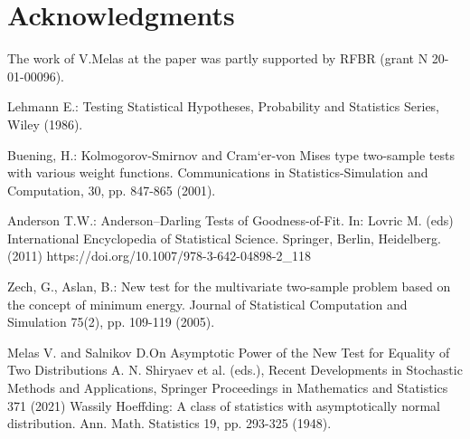 \documentclass[final,11pt,3p]{elsarticle}
\begin{document}
\section*{Acknowledgments}
The work of V.Melas at the paper was partly supported by RFBR (grant N 20-01-00096). 
\begin{thebibliography}{6}

Lehmann E.: Testing  Statistical  Hypotheses,  Probability  and  Statistics  Series,  Wiley (1986).

Buening, H.: Kolmogorov-Smirnov and Cram`er-von Mises type two-sample tests with various weight functions. Communications in Statistics-Simulation and Computation, 30, pp. 847-865 (2001).

Anderson T.W.:  Anderson–Darling Tests of Goodness-of-Fit. In: Lovric M. (eds) International Encyclopedia of Statistical Science. Springer, Berlin, Heidelberg.(2011) https://doi.org/10.1007/978-3-642-04898-2\_118

Zech, G., Aslan, B.: New test for the multivariate two-sample problem based on the concept of minimum energy. Journal of Statistical Computation and Simulation 75(2), pp. 109-119 (2005).

Melas V. and Salnikov D.On Asymptotic Power of the New Test for Equality
of Two Distributions
A. N. Shiryaev et al. (eds.), Recent Developments in Stochastic Methods and Applications, Springer Proceedings in
Mathematics and Statistics 371 (2021)
Wassily Hoeffding: A class of statistics with asymptotically normal distribution. Ann. Math. Statistics 19, pp. 293-325 (1948).



\end{thebibliography}
\end{document}
